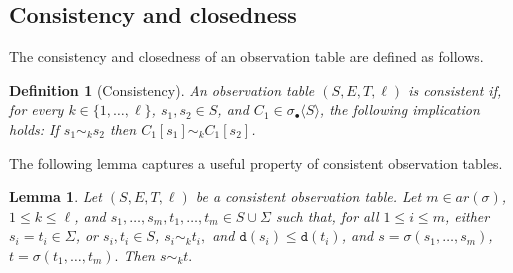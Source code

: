 \documentclass[preprint,12pt,english]{article}
\def\hole{\bullet}
\def\tr{\mathtt{r}}
\def\cT{\mathcal{T}}
\def\depth{\mathtt{d}}
\newcommand\pair[1]{\langle{#1}\rangle}
\newcommand\comment[1]{}
\newtheorem{definition}{Definition}
\newtheorem{lemma}{Lemma}
\begin{document}
\subsection{Consistency and closedness}
\comment{
Using this definition, we choose the representative $\tr(t)$ of $t\in S\cup X(S)$ in a closed observation table $(S,E,T,\ell)$ to be the minimum element of the set $\{s\in S\mid s\sim t\}.$ Note that $\{s\in S\mid s\sim t\}\neq \emptyset$ when $(S,E,T)$ is closed,  thus $\tr(t)$ is well defined for all $t\in S\cup X(S)$. Also, if $t\in X(S)$ has $\depth(t)>\ell$ then $s\sim t$ for all $s\in S$, and thus $\tr(t)$ is the minimum element of $S$. For this reason, we we do not need to keep a row for elements  $t\in X(S)\setminus \cT(Sk\cup\Sigma)_{[\ell]}$ in the observation table because $\tr(t)$ is known a priori.
}

The   consistency and closedness of an observation table are defined as follows.
\begin{definition}[Consistency]
An observation table $(S,E,T,\ell)$ is consistent if, for every $k\in\{1,\ldots, \ell\}$, $s_1,s_2\in S$, and $C_1\in\sigma_\hole\pair{S}$, the following implication holds:
If $s_1\sim_k s_2$ then $C_1[s_1]\sim_k C_1[s_2]$. 
\end{definition}
The following lemma captures a useful property of consistent observation tables.
\begin{lemma}
\label{lele}
Let $(S,E,T,\ell)$ be a consistent observation table. Let $m\in ar(\sigma)$, $1\leq k\leq \ell$, and $s_1,\ldots,s_m,t_1,\ldots,t_m\in S\cup\Sigma$ such that, for all $1\leq i\leq m$, either 
$s_i=t_i\in\Sigma$, or 
$s_i,t_i\in S$, $s_i\sim_k t_i,$ and $\depth(s_i)\leq\depth(t_i)$,
and $s=\sigma(s_1,\ldots,s_m)$, $t=\sigma(t_1,\ldots,t_m).$ Then $s\sim_k t.$
\end{lemma}
\end{document}
